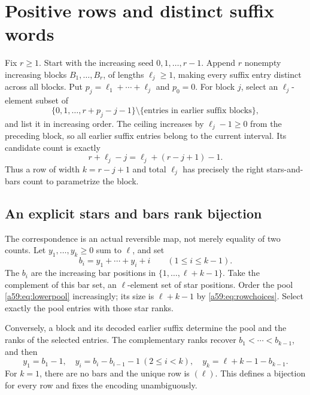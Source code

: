 \documentclass[11pt,letterpaper]{article}
\theoremstyle{remark}\newtheorem{remark}[theorem]{Remark}
\theoremstyle{remark}\newtheorem{wremark}{Remark}\renewcommand{\thewremark}{W\arabic{wremark}}
\theoremstyle{plain}\newtheorem{wcorollary}[wremark]{Corollary}
\begin{document}
\section{Positive rows and distinct suffix words}\label{a59:sec:positive}
Fix $r\ge1$. Start with the increasing seed $0,1,\ldots,r-1$. Append $r$ nonempty increasing blocks $B_1,\ldots,B_r$, of lengths $\ell_j\ge1$, making every suffix entry distinct across all blocks. Put $p_j=\ell_1+\cdots+\ell_j$ and $p_0=0$. For block $j$, select an $\ell_j$-element subset of
\begin{equation}\label{a59:eq:lowerpool}
 \{0,1,\ldots,r+p_j-j-1\}\setminus
       \{\text{entries in earlier suffix blocks}\},
\end{equation}
and list it in increasing order. The ceiling increases by $\ell_j-1\ge0$ from the preceding block, so all earlier suffix entries belong to the current interval. Its candidate count is exactly
\begin{equation}\label{a59:eq:rowchoices}
 r+\ell_j-j=\ell_j+(r-j+1)-1.
\end{equation}
Thus a row of width $k=r-j+1$ and total $\ell_j$ has precisely the right stars-and-bars count to parametrize the block.

\subsection{An explicit stars and bars rank bijection}
The correspondence is an actual reversible map, not merely equality of two counts. Let $y_1,\ldots,y_k\ge0$ sum to $\ell$, and set
\[
 b_i=y_1+\cdots+y_i+i\qquad(1\le i\le k-1).
\]
The $b_i$ are the increasing bar positions in $\{1,\ldots,\ell+k-1\}$. Take the complement of this bar set, an $\ell$-element set of star positions. Order the pool \eqref{a59:eq:lowerpool} increasingly; its size is $\ell+k-1$ by \eqref{a59:eq:rowchoices}. Select exactly the pool entries with those star ranks.

Conversely, a block and its decoded earlier suffix determine the pool and the ranks of the selected entries. The complementary ranks recover $b_1<\cdots<b_{k-1}$, and then
\[
 y_1=b_1-1,\quad y_i=b_i-b_{i-1}-1\ (2\le i<k),\quad
 y_k=\ell+k-1-b_{k-1}.
\]
For $k=1$, there are no bars and the unique row is $(\ell)$. This defines a bijection for every row and fixes the encoding unambiguously.
\end{document}
